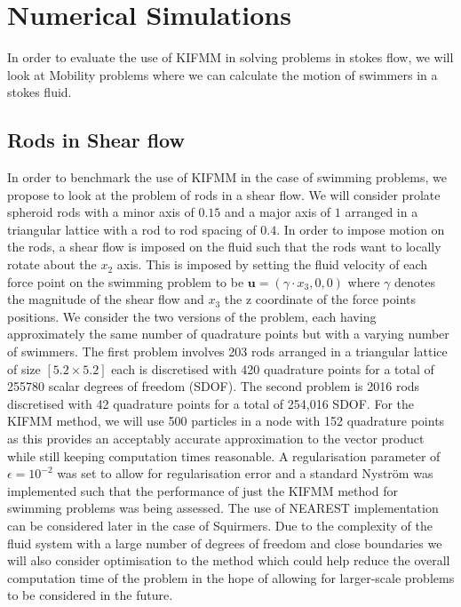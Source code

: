 \FloatBarrier
\section{Numerical Simulations} \label{sec:NumericalSims}
In order to evaluate the use of KIFMM in solving problems in stokes flow, we will look at Mobility problems where we can calculate the motion of swimmers in a stokes fluid.



\subsection{Rods in Shear flow}
In order to benchmark the use of KIFMM in the case of swimming problems, we propose to look at the problem of rods in a shear flow. We will consider prolate spheroid rods with a minor axis of $0.15$ and a major axis of $1$ arranged in a triangular lattice with a rod to rod spacing of $0.4$. In order to impose motion on the rods, a shear flow is imposed on the fluid such that the rods want to locally rotate about the $x_2$ axis. This is imposed by setting the fluid velocity of each force point on the swimming problem to be $\bm{u} = (\gamma\cdot x_3,0,0)$ where $\gamma$ denotes the magnitude of the shear flow and $x_3$ the z coordinate of the force points positions. We consider the two versions of the problem, each having approximately the same number of quadrature points but with a varying number of swimmers. The first problem involves 203 rods arranged in a triangular lattice of size $[5.2 \times 5.2]$ each is discretised with 420 quadrature points for a total of 255780 scalar degrees of freedom (SDOF). The second problem is 2016 rods discretised with 42 quadrature points for a total of 254,016 SDOF.  For the KIFMM method, we will use 500 particles in a node with 152 quadrature points as this provides an acceptably accurate approximation to the vector product while still keeping computation times reasonable. A regularisation parameter of $\epsilon=10^{-2}$ was set to allow for regularisation error and a standard Nyström was implemented such that the performance of just the KIFMM method for swimming problems was being assessed. The use of NEAREST implementation can be considered later in the case of Squirmers. Due to the complexity of the fluid system with a large number of degrees of freedom and close boundaries we will also consider optimisation to the method which could help reduce the overall computation time of the problem in the hope of allowing for larger-scale problems to be considered in the future. 


